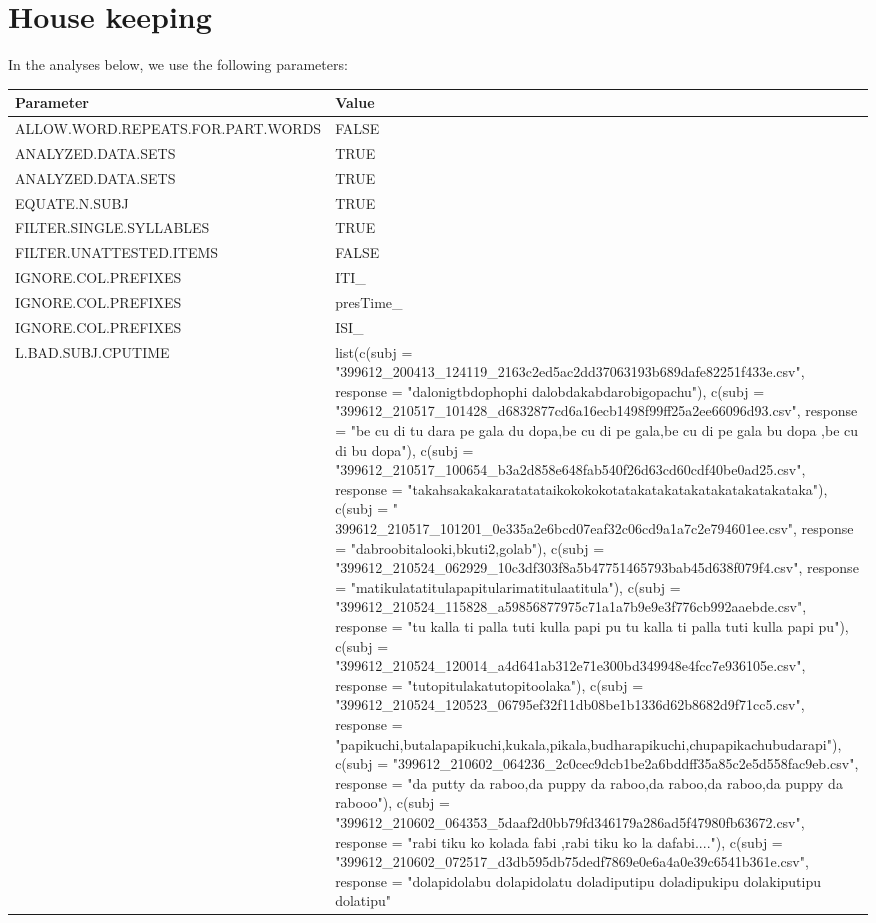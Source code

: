 \documentclass[
]{article}
\begin{document}
\section{House keeping}\label{house-keeping}

In the analyses below, we use the following parameters:

\begin{longtable}[t]{>{\raggedright\arraybackslash}p{20em}>{\raggedright\arraybackslash}p{30em}}
\toprule
Parameter & Value\\
\midrule
ALLOW.WORD.REPEATS.FOR.PART.WORDS & FALSE\\
ANALYZED.DATA.SETS & \vphantom{1} TRUE\\
ANALYZED.DATA.SETS & TRUE\\
EQUATE.N.SUBJ & TRUE\\
FILTER.SINGLE.SYLLABLES & TRUE\\
\addlinespace
FILTER.UNATTESTED.ITEMS & FALSE\\
IGNORE.COL.PREFIXES & ITI\_\\
IGNORE.COL.PREFIXES & presTime\_\\
IGNORE.COL.PREFIXES & ISI\_\\
L.BAD.SUBJ.CPUTIME & list(c(subj = "399612\_200413\_124119\_2163c2ed5ac2dd37063193b689dafe82251f433e.csv", response = "dalonigtbdophophi dalobdakabdarobigopachu"), c(subj = "399612\_210517\_101428\_d6832877cd6a16ecb1498f99ff25a2ee66096d93.csv", response = "be cu di tu dara pe gala du dopa,be cu di pe gala,be cu di pe gala bu dopa ,be cu di bu dopa"), c(subj = "399612\_210517\_100654\_b3a2d858e648fab540f26d63cd60cdf40be0ad25.csv", response = "takahsakakakaratatataikokokokotatakatakatakatakatakatakataka"), c(subj = " 399612\_210517\_101201\_0e335a2e6bcd07eaf32c06cd9a1a7c2e794601ee.csv", 
response = "dabroobitalooki,bkuti2,golab"), c(subj = "399612\_210524\_062929\_10c3df303f8a5b47751465793bab45d638f079f4.csv", response = "matikulatatitulapapitularimatitulaatitula"), c(subj = "399612\_210524\_115828\_a59856877975c71a1a7b9e9e3f776cb992aaebde.csv", response = "tu kalla ti palla tuti kulla papi pu tu kalla ti palla tuti kulla papi pu"), c(subj = "399612\_210524\_120014\_a4d641ab312e71e300bd349948e4fcc7e936105e.csv", response = "tutopitulakatutopitoolaka"), c(subj = "399612\_210524\_120523\_06795ef32f11db08be1b1336d62b8682d9f71cc5.csv", 
response = "papikuchi,butalapapikuchi,kukala,pikala,budharapikuchi,chupapikachubudarapi"), c(subj = "399612\_210602\_064236\_2c0cec9dcb1be2a6bddff35a85c2e5d558fac9eb.csv", response = "da putty da raboo,da puppy da raboo,da raboo,da raboo,da puppy da rabooo"), c(subj = "399612\_210602\_064353\_5daaf2d0bb79fd346179a286ad5f47980fb63672.csv", response = "rabi tiku ko kolada fabi ,rabi tiku ko la dafabi...."), c(subj = "399612\_210602\_072517\_d3db595db75dedf7869e0e6a4a0e39c6541b361e.csv", response = "dolapidolabu dolapidolatu doladiputipu doladipukipu dolakiputipu dolatipu"

\end{longtable}
\end{document}
